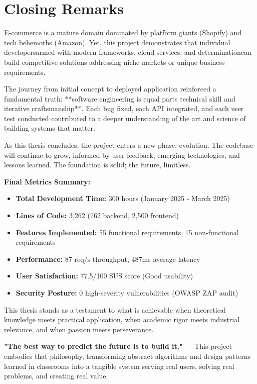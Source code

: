 \documentclass[12pt, a4paper]{report}
\begin{document}
{{\section{Closing Remarks}

E-commerce is a mature domain dominated by platform giants (Shopify) and tech behemoths (Amazon). Yet, this project demonstrates that individual developersarmed with modern frameworks, cloud services, and determinationcan build competitive solutions addressing niche markets or unique business requirements.

The journey from initial concept to deployed application reinforced a fundamental truth: **software engineering is equal parts technical skill and iterative craftsmanship**. Each bug fixed, each API integrated, and each user test conducted contributed to a deeper understanding of the art and science of building systems that matter.

As this thesis concludes, the project enters a new phase: evolution. The codebase will continue to grow, informed by user feedback, emerging technologies, and lessons learned. The foundation is solid; the future, limitless.

\vspace{1cm}
\noindent \textbf{Final Metrics Summary:}

\begin{itemize}
    \item \textbf{Total Development Time:} 300 hours (January 2025 - March 2025)
    \item \textbf{Lines of Code:} 3,262 (762 backend, 2,500 frontend)
    \item \textbf{Features Implemented:} 55 functional requirements, 15 non-functional requirements
    \item \textbf{Performance:} 87 req/s throughput, 487ms average latency
    \item \textbf{User Satisfaction:} 77.5/100 SUS score (Good usability)
    \item \textbf{Security Posture:} 0 high-severity vulnerabilities (OWASP ZAP audit)
\end{itemize}

\vspace{0.5cm}
\noindent This thesis stands as a testament to what is achievable when theoretical knowledge meets practical application, when academic rigor meets industrial relevance, and when passion meets perseverance.

\textbf{"The best way to predict the future is to build it."} --- This project embodies that philosophy, transforming abstract algorithms and design patterns learned in classrooms into a tangible system serving real users, solving real problems, and creating real value.

}}
\end{document}
